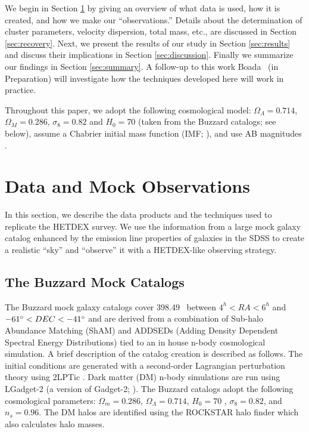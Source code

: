 \documentclass[fleqn,usenatbib]{mnras}
\begin{document}
We begin in Section \ref{sec:Data} by giving an overview of what data is used, how it is created, and how we make our ``observations.'' Details about the determination of cluster parameters, velocity dispersion, total mass, etc., are discussed in Section \ref{sec:recovery}. Next, we present the results of our study in Section \ref{sec:results} and discuss their implications in Section \ref{sec:discussion}. Finally we summarize our findings in Section \ref{sec:summary}. A follow-up to this work Boada \etal\ (in Preparation) will investigate how the techniques developed here will work in practice. 

Throughout this paper, we adopt the following cosmological model: $\Omega_\Lambda = 0.714$, $\Omega_M = 0.286$, $\sigma_8 = 0.82$ and $H_0= 70$ \kms \mpc (taken from the Buzzard catalogs; see below), assume a Chabrier initial mass function (IMF; \citealt{Chabrier2003}), and use AB magnitudes \citep{Oke1974}.

\section{Data and Mock Observations}\label{sec:Data}
In this section, we describe the data products and the techniques used to replicate the HETDEX survey. We use the information from a large mock galaxy catalog enhanced by the emission line properties of galaxies in the SDSS to create a realistic ``sky'' and ``observe'' it with a HETDEX-like observing strategy.

\subsection{The Buzzard Mock Catalogs}
The Buzzard mock galaxy catalogs cover 398.49 \degsq\ between $4^h< RA < 6^h$ and $-61\hbox{$^\circ$} < DEC < -41\hbox{$^\circ$}$ and are derived from a combination of Sub-halo Abundance Matching (ShAM) and ADDSEDs (Adding Density Dependent Spectral Energy Distributions) tied to an in house n-body cosmological simulation. A brief description of the catalog creation is described as follows. The initial conditions are generated with a second-order Lagrangian perturbation theory using {\sc 2LPTic} \citep{Crocce2006}. Dark matter (DM) n-body simulations are run using {\sc LGadget-2} (a version of {\sc Gadget-2}; \citealt{Springel2005}). The Buzzard catalogs adopt the following cosmological parameters: $\Omega_m = 0.286$, $\Omega_\Lambda = 0.714$, $H_0 = 70$ \kms \mpc, $\sigma_8 = 0.82$, and $n_s = 0.96$. The DM halos are identified using the {\sc ROCKSTAR} halo finder \citep{Behroozi2013} which also calculates halo masses. 
\end{document}
